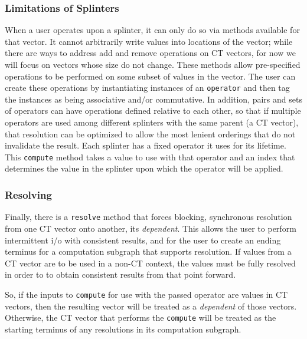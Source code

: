 \documentclass[pageno]{jpaper}
\begin{document}
\subsubsection{Limitations of Splinters}
When a user operates upon a splinter, it can only do so via methods
available for that vector. It cannot arbitrarily write values into locations of
the vector; while there are ways to address add and remove operations on CT
vectors, for now we will focus on vectors whose size do not change.
These methods allow pre-specified operations to be performed on some subset of
values in the vector. The user can create these operations by instantiating
instances of an \texttt{operator} and then tag the instances as being associative and/or
commutative. In addition, pairs and sets of operators can have operations
defined relative to each other, so that if multiple operators are used among
different splinters with the same parent (a CT vector), that resolution can
be optimized to allow the most lenient orderings that do not invalidate the
result. Each splinter has a fixed operator it uses for its lifetime. 
This \texttt{compute} method takes a value to use with that operator and an index that 
determines the value in the splinter upon which the operator will be applied.

\subsubsection{Resolving}
Finally, there is a \texttt{resolve} method that forces blocking, synchronous
resolution from one CT vector onto another, its \textit{dependent}. 
This allows the user to perform intermittent i/o
with consistent results, and for the user to create an ending terminus for a
computation subgraph that supports resolution. If values from a CT vector are
to be used in a non-CT context, the values must be fully resolved in order to
to obtain consistent results from that point forward.

So, if the inputs to \texttt{compute} for use with the passed operator are values in 
CT vectors, then the resulting vector will be treated as a \textit{dependent} of those 
vectors. Otherwise, the CT vector that performs
the \texttt{compute} will be treated as the starting terminus of any resolutions in its 
computation subgraph.
\end{document}
